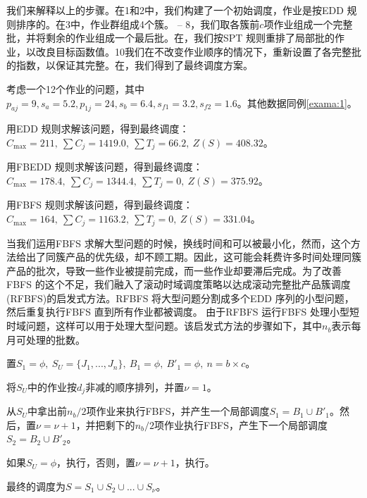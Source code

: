 我们来解释以上的步骤。在\Step1和\Step2中，我们构建了一个初始调度，作业是按EDD 规则排序的。在\Step3中，作业群组成4个簇。 -- 8，我们取各簇前$c$项作业组成一个完整批，并将剩余的作业组成一个最后批。在，我们按SPT 规则重排了局部批的作业，以改良目标函数值。\Step10我们在不改变作业顺序的情况下，重新设置了各完整批的指数，以保证其完整。在，我们得到了最终调度方案。
\begin{example}
考虑一个12个作业的问题，其中$p_{aj}=9,s_a=5.2,p_{1j}=24,s_b=6.4,s_{f1}=3.2,s_{f2}=1.6$。其他数据同例\ref{exama:1}。
\end{example}
\begin{asparaenum}
\renewcommand{\labelenumi}{解\theenumi:}
\item 用EDD 规则求解该问题，得到最终调度：$C_{\max}=211,\ \sum C_j = 1419.0,\ \sum T_j = 66.2,\ Z(S)=408.32$。
\item 用FBEDD 规则求解该问题，得到最终调度：$C_{\max}=178.4,\ \sum C_j = 1344.4,\ \sum T_j = 0,\ Z(S)=375.92$。
\item 用FBFS 规则求解该问题，得到最终调度：$C_{\max}=164,\ \sum C_j = 1163.2,\ \sum T_j = 0,\ Z(S)=331.04$。
\end{asparaenum}
当我们运用FBFS 求解大型问题的时候，换线时间和可以被最小化，然而，这个方法给出了同簇产品的优先级，却不顾工期。因此，这可能会耗费许多时间处理同簇产品的批次，导致一些作业被提前完成，而一些作业却要滞后完成。为了改善FBFS 的这个不足，我们融入了滚动时域调度策略以达成滚动完整批产品簇调度(RFBFS)的启发式方法。RFBFS 将大型问题分割成多个EDD 序列的小型问题，然后重复执行FBFS 直到所有作业都被调度。
由于RFBFS 运行FBFS 处理小型短时域问题，这样可以用于处理大型问题。该启发式方法的步骤如下，其中$n_b$表示每月可处理的批数。
\begin{asparaenum}
\renewcommand{\labelenumi}{\heiti 步骤\theenumi~}
\item 置$S_1 = \phi,\ S_U = \{J_1,...,J_n\},\ B_1 = \phi,\ B'_1 = \phi,\  n = b \times c$。
\item 将$S_U$中的作业按$d_j$非减的顺序排列，并置$\nu = 1$。
\item 从$S_U$中拿出前$n_b/2$项作业来执行FBFS，并产生一个局部调度$S_1 = B_1 \cup B'_1$。然后，置$\nu = \nu + 1$，并把剩下的$n_b/2$项作业执行FBFS，产生下一个局部调度$S_2 = B_2 \cup B'_2$。
\item 如果$S_U=\phi$，执行，否则，置$\nu = \nu + 1$，执行。
\item 最终的调度为$S=S_1\cup S_2\cup...\cup S_{\nu}$。
\end{asparaenum}

